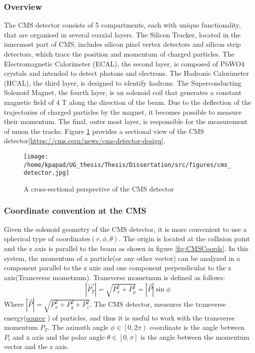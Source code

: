 \subsubsection{Overview}
\label{sec:org3cfeb42}
The CMS detector consists of 5 compartments, each with unique functionality, that are organised in several coaxial layers. The Silicon Tracker, located in the innermost part of CMS, includes silicon pixel vertex detectors and silicon strip detectors, which trace the position and momentum of charged particles. The Electromagnetic Calorimeter (ECAL), the second layer, is composed of PbWO4 crystals and intended to detect photons and electrons. The Hadronic Calorimeter (HCAL), the third layer, is designed to identify hadrons. The Superconducting Solenoid Magnet, the fourth layer, is an solenoid coil that generates a constant magnetic field of 4 T along the direction of the  beam. Due to the deflection of the trajectories of charged particles by the magnet, it becomes possible to measure their momentum. The final, outer most layer, is responsible for the measurement of muon the tracks. Figure \ref{fig:CMS_detector} provides a sectional view of the CMS detector[\url{https://cms.cern/news/cms-detector-design}].
\begin{figure}[hb]
\centering
\texttt{[image: /home/kpapad/UG\_thesis/Thesis/Dissertation/src/figures/cms\_detector.jpg]}
\caption{A cross-sectional perspective of the CMS detector}
\label{fig:CMS_detector}
\end{figure}

\subsubsection{Coordinate convention at the CMS}
\label{sec:orge8fa37a}
Given the solenoid geometry of the CMS detector, it is more convenient to use a spherical type of coordinates\(\left(r, \phi, \theta \right)\). The origin is located at the collision point and the z axis is parallel to the beam as shown in figure \ref{fig:CMSCoords}. In this system, the momentum of a particle(or any other vector) can be analyzed in a component parallel to the z axis and one component perpendicular to the z axis(Transverse mometnum). Transverse mometnum is defined as follows:
\begin{equation}
|\vec{P_{T}}| = \sqrt{P_{x}^{2} + P_{y}^{2}} = |\vec{P}|\sin{\phi}
\end{equation}
Where \(|\vec{P}| = \sqrt{P_{x}^{2} + P_{y}^{2} + P_{z}^{2}}\). The CMS detector, measures the transverse energy(\href{https://www.lhc-closer.es/taking\_a\_closer\_look\_at\_lhc/0.momentum}{source} ) of particles, and thus it is useful to work with the transverse momentum \(P_{T}\). The azimuth angle  \(\phi \in \left[0, 2\pi\right)\) coordinate is the angle between \(P_{t}\) and x axis and the polar angle  \(\theta \in \left[0, \pi   \right]\) is the angle between the momentum vector and the z axis.

